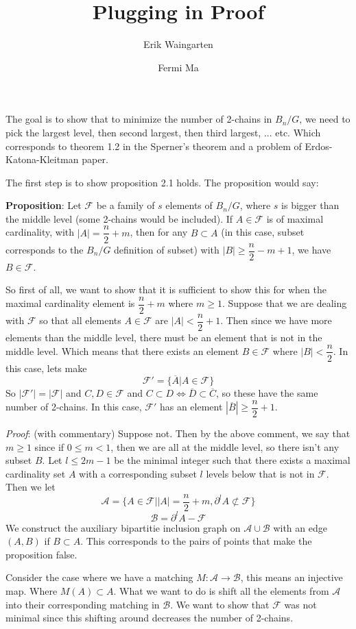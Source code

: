 \documentclass[11pt]{article}
\author{Erik Waingarten \and Fermi Ma}
\title{Plugging in Proof}
\newcommand{\F}{\mathcal{F}}
\newcommand{\A}{\mathcal{A}}
\newcommand{\B}{\mathcal{B}}
\begin{document}
         
\maketitle

The goal is to show that to minimize the number of 2-chains in $B_n/G$, we need to pick the largest level, then second largest, then third largest, ... etc. Which corresponds to theorem 1.2 in the Sperner's theorem and a problem of Erdos-Katona-Kleitman paper.

The first step is to show proposition 2.1 holds. The proposition would say:

\textbf{Proposition}: Let $\F$ be a family of $s$ elements of $B_n/G$, where $s$ is bigger than the middle level (some 2-chains would be included). If $A \in \F$ is of maximal cardinality, with $|A| = \dfrac{n}{2} + m$, then for any $B \subset A$ (in this case, subset corresponds to the $B_n/G$ definition of subset) with $|B| \geq \dfrac{n}{2} - m + 1$, we have $B \in \F$.

So first of all, we want to show that it is sufficient to show this for when the maximal cardinality element is $\dfrac{n}{2} + m$ where $m\geq 1$. Suppose that we are dealing with $\F$ so that all elements $A \in \F$ are $|A| < \dfrac{n}{2} + 1$. Then since we have more elements than the middle level, there must be an element that is not in the middle level. Which means that there exists an element $B \in \F$ where $|B| < \dfrac{n}{2}$. In this case, lets make 
\[ \F' = \{ \overline{A} | A \in \F \} \]
So $|\F'| = |\F|$ and $C, D \in \F$ and $C \subset D \iff \overline{D} \subset \overline{C}$, so these have the same number of 2-chains. In this case, $\F'$ has an element $|\overline{B}| \geq \dfrac{n}{2} + 1$. 

\textit{Proof}: (with commentary) Suppose not. Then by the above comment, we say that $m\geq 1$ since if $0\leq m<1$, then we are all at the middle level, so there isn't any subset $B$. Let $l \leq 2m - 1$ be the minimal integer such that there exists a maximal cardinality set $A$ with a corresponding subset $l$ levels below that is not in $\F$. Then we let 
\[ \A = \{ A \in \F | |A| = \dfrac{n}{2} + m, \partial^lA \not\subset \F \} \]
\[ \B = \partial^lA - \F \]
We construct the auxiliary bipartitie inclusion graph on $\A \cup \B$ with an edge $(A, B)$ if $B \subset A$. This corresponds to the pairs of points that make the proposition false. 

Consider the case where we have a matching $M: \A \rightarrow \B$, this means an injective map. Where $M(A) \subset A$. What we want to do is shift all the elements from $\A$ into their corresponding matching in $\B$. We want to show that $\F$ was not minimal since this shifting around decreases the number of 2-chains. 
\end{document}
